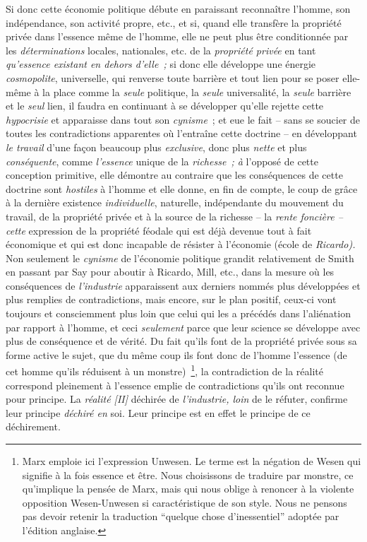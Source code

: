 \documentclass[french,twoside]{book} %
\begin{document}
Si donc cette économie politique débute en paraissant reconnaître l’homme, son indépendance, son activité propre, etc., et si, quand elle transfère la propriété privée dans l’essence même de l’homme, elle ne peut plus être conditionnée par les \emph{déterminations} locales, nationales, etc. de la \emph{propriété privée} en tant \emph{qu’essence existant en dehors d’elle ;} si donc elle développe une énergie \emph{cosmopolite}, universelle, qui renverse toute barrière et tout lien pour se poser elle-même à la place comme la \emph{seule} politique, la \emph{seule} universalité, la \emph{seule} barrière et le \emph{seul} lien, il faudra en continuant à se développer qu’elle rejette cette \emph{hypocrisie} et apparaisse dans tout son \emph{cynisme} ; et eue le fait – sans se soucier de toutes les contradictions apparentes où l’entraîne cette doctrine – en développant \emph{le travail} d’une façon beaucoup plus \emph{exclusive}, donc plus \emph{nette} et plus \emph{conséquente}, comme \emph{l’essence} unique de la \emph{richesse ; à} l’opposé de cette conception primitive, elle démontre au contraire que les conséquences de cette doctrine sont \emph{hostiles} à l’homme et elle donne, en fin de compte, le coup de grâce à la dernière existence \emph{individuelle}, naturelle, indépendante du mouvement du travail, de la propriété privée et à la source de la richesse – la \emph{rente foncière – cette} expression de la propriété féodale qui est déjà devenue tout à fait économique et qui est donc incapable de résister à l’économie (école de \emph{Ricardo).} Non seulement le \emph{cynisme} de l’économie politique grandit relativement de Smith en passant par Say pour aboutir à Ricardo, Mill, etc., dans la mesure où les conséquences de \emph{l’industrie} apparaissent aux derniers nommés plus développées et plus remplies de contradictions, mais encore, sur le plan positif, ceux-ci vont toujours et consciemment plus loin que celui qui les a précédés dans l’aliénation par rapport à l’homme, et ceci \emph{seulement} parce que leur science se développe avec plus de conséquence et de vérité. Du fait qu’ils font de la propriété privée sous sa forme active le sujet, que du même coup ils font donc de l’homme l’essence (de cet homme qu’ils réduisent à un monstre) \footnote{Marx emploie ici l’expression Unwesen. Le terme est la négation de Wesen qui signifie à la fois essence et être. Nous choisissons de traduire par monstre, ce qu’implique la pensée de Marx, mais qui nous oblige à renoncer à la violente opposition Wesen-Unwesen si caractéristique de son style. Nous ne pensons pas devoir retenir la traduction “quelque chose d’inessentiel” adoptée par l’édition anglaise.}, la contradiction de la réalité correspond pleinement à l’essence emplie de contradictions qu’ils ont reconnue pour principe. La \emph{réalité [II]} déchirée de \emph{l’industrie, loin} de le réfuter, confirme leur principe \emph{déchiré en} soi. Leur principe est en effet le principe de ce déchirement.\par
\end{document}

